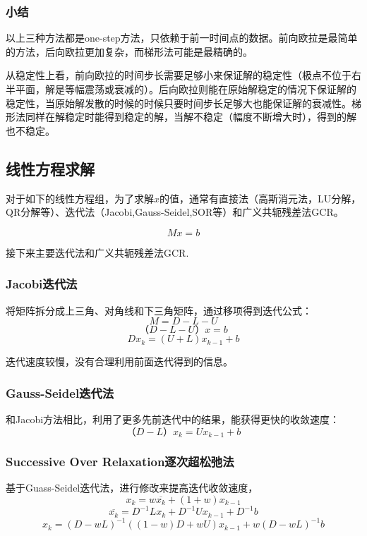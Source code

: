 \documentclass[12pt]{article}
\begin{document}
\subsubsection{小结}
\qquad 以上三种方法都是one-step方法，只依赖于前一时间点的数据。前向欧拉是最简单的方法，后向欧拉更加复杂，而梯形法可能是最精确的。

\qquad 从稳定性上看，前向欧拉的时间步长需要足够小来保证解的稳定性（极点不位于右半平面，解是等幅震荡或衰减的）。后向欧拉则能在原始解稳定的情况下保证解的稳定性，当原始解发散的时候的时候只要时间步长足够大也能保证解的衰减性。梯形法同样在解稳定时能得到稳定的解，当解不稳定（幅度不断增大时），得到的解也不稳定。

\subsection{线性方程求解}
对于如下的线性方程组，为了求解$x$的值，通常有直接法（高斯消元法，LU分解，QR分解等）、迭代法（Jacobi,Gauss-Seidel,SOR等）和广义共轭残差法GCR。

\begin{equation}
    Mx=b
\end{equation}

接下来主要迭代法和广义共轭残差法GCR.

\subsubsection{Jacobi迭代法}
\qquad 将矩阵拆分成上三角、对角线和下三角矩阵，通过移项得到迭代公式：
\begin{equation}
    M=D-L-U
\end{equation}
\begin{equation}
    （D-L-U）x=b
\end{equation}
\begin{equation}
    Dx_k=(U+L)x_{k-1}+b
\end{equation}

\qquad 迭代速度较慢，没有合理利用前面迭代得到的信息。
\subsubsection{Gauss-Seidel迭代法}
\qquad 和Jacobi方法相比，利用了更多先前迭代中的结果，能获得更快的收敛速度：
\begin{equation}
    （D-L）x_k=Ux_{k-1}+b
\end{equation}
\subsubsection{Successive Over Relaxation逐次超松弛法}
\qquad 基于Guass-Seidel迭代法，进行修改来提高迭代收敛速度，
\begin{equation}
  x_k = w\overline{x_k} + (1+w)x_{k-1}
\end{equation}
\begin{equation}
  \overline{x_k} = D^{-1}Lx_k + D^{-1}Ux_{k-1} + D^{-1}b
\end{equation}
\begin{equation}
  x_k = (D-wL)^{-1}((1-w)D+wU)x_{k-1} + w(D-wL)^{-1}b
\end{equation}
\end{document}
